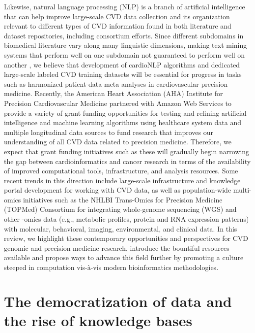 \documentclass[letter]{bioinfo}
\begin{document}
Likewise, natural language processing (NLP) is a branch of artificial intelligence that can help improve large-scale CVD data collection and its organization relevant to different types of CVD information found in both literature and dataset repositories, including consortium efforts.  Since different subdomains in biomedical literature vary along many linguistic dimensions, making text mining systems that perform well on one subdomain not guaranteed to perform well on another \citep{Lippincott:2011:Exploring, Kilicoglu:2018:Biomedical, Khomtchouk:2018:Biochat}, we believe that development of cardioNLP algorithms and dedicated large-scale labeled CVD training datasets will be essential for progress in tasks such as harmonized patient-data meta analyses in cardiovascular precision medicine.  Recently, the American Heart Association (AHA) Institute for Precision Cardiovascular Medicine partnered with Amazon Web Services to provide a variety of grant funding opportunities for testing and refining artificial intelligence and machine learning algorithms using healthcare system data and multiple longitudinal data sources to fund research that improves our understanding of all CVD data related to precision medicine.  Therefore, we expect that grant funding initiatives such as these will gradually begin narrowing the gap between cardioinformatics and cancer research in terms of the availability of improved computational tools, infrastructure, and analysis resources.  Some recent trends in this direction include large-scale infrastructure and knowledge portal development \citep{Kass-Hout:2018:American, Khomtchouk:2018:HeartBioPortal, Broad:NA:Cardiovascular, Broad:NA:Cerebrovascular} for working with CVD data, as well as population-wide multi-omics initiatives such as the NHLBI Trans-Omics for Precision Medicine (TOPMed) Consortium \citep{NHLBI:2014:TransOmics} for integrating whole-genome sequencing (WGS) and other -omics data (e.g., metabolic profiles, protein and RNA expression patterns) with molecular, behavioral, imaging, environmental, and clinical data.  In this review, we highlight these contemporary opportunities and perspectives for CVD genomic and precision medicine research, introduce the bountiful resources available and propose ways to advance this field further by promoting a culture steeped in computation vis-\`{a}-vis modern bioinformatics methodologies.


\section*{The democratization of data and the rise of knowledge bases}
\end{document}
